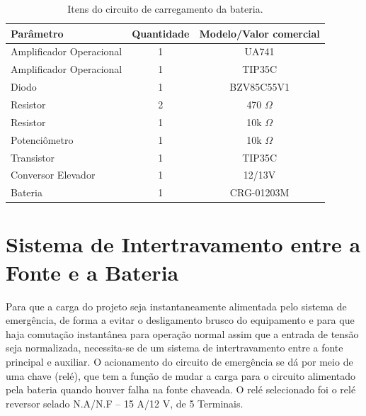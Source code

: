 \begin{table}[H]
    \centering
    \footnotesize
    \caption{Itens do circuito de carregamento da bateria.}
    \label{Itens_circuito}
    \begin{adjustbox}{max width = \textwidth}
        \begin{tabular}{|l|c|c|}
            \hline
            \rowcolor[HTML]{A8DADC}
            \textbf{Parâmetro} & \textbf{Quantidade} & \textbf{Modelo/Valor comercial}  \\ \hline
            Amplificador Operacional & 1 & UA741
            \\ \hline
            Amplificador Operacional & 1 & TIP35C
            \\ \hline
            Diodo & 1 & BZV85C55V1
            \\ \hline
             Resistor  &  2  & 470 $\Omega$
             \\ \hline
              Resistor  & 1 & 10k $\Omega$
             \\ \hline
              
                Potenciômetro & 1 & 10k $\Omega$
             \\ \hline
                Transistor & 1 & TIP35C
             \\ \hline
                Conversor Elevador & 1 & 12/13V
             \\ \hline
                      Bateria & 1 & CRG-01203M
             \\ \hline 
        \end{tabular}
    \end{adjustbox}
\end{table}

\section{Sistema de Intertravamento entre a Fonte e a Bateria}

Para que a carga do projeto seja instantaneamente alimentada pelo sistema de emergência, de forma a evitar o desligamento brusco do equipamento e para que haja comutação instantânea para operação normal assim que a entrada de tensão seja normalizada, necessita-se de um sistema de intertravamento entre a fonte principal e auxiliar. O acionamento do circuito de emergência se dá por meio de uma chave (relé), que tem a função de mudar a carga para o circuito alimentado pela bateria quando houver falha na fonte chaveada. O relé selecionado foi o relé reversor selado N.A/N.F – 15 A/12 V, de 5 Terminais.


